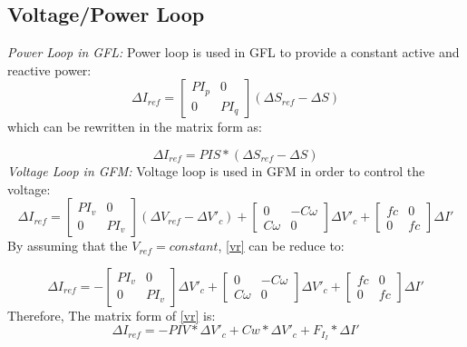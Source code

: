 \subsection{Voltage/Power Loop}
\textit{Power Loop in GFL:} Power loop is used in GFL to provide a constant active and reactive power:
\begin{equation}\label{pr}
\Delta I_{ref}=\begin{bmatrix}PI_p & 0 \\ 0 & PI_q \end{bmatrix}(\Delta S_{ref}-\Delta S)
\end{equation}
which  can be rewritten in the matrix form as:

\begin{equation}\label{pr2}
\Delta I_{ref}=PIS*(\Delta S_{ref}-\Delta S)
\end{equation}
\textit{Voltage Loop in GFM:} Voltage loop is used in GFM in order to control the voltage:
\begin{equation}\label{vr}
\Delta I_{ref}=\begin{bmatrix}PI_v & 0 \\ 0 & PI_v \end{bmatrix}(\Delta V_{ref} -\Delta V'_c)+\begin{bmatrix}0 & -C\omega \\ C\omega & 0 \end{bmatrix}\Delta V'_c+\begin{bmatrix}fc & 0 \\ 0 & fc \end{bmatrix}\Delta I'
\end{equation}
By assuming that the $V_{ref}=constant$, \ref{vr} can be reduce to:

\begin{equation}\label{vr2}
\Delta I_{ref}=-\begin{bmatrix}PI_v & 0 \\ 0 & PI_v \end{bmatrix}\Delta V'_c+\begin{bmatrix}0 & -C\omega \\ C\omega & 0 \end{bmatrix}\Delta V'_c+\begin{bmatrix}fc & 0 \\ 0 & fc \end{bmatrix}\Delta I'
\end{equation}
Therefore, The matrix form of \ref{vr} is:
\begin{equation}\label{vr3}
\Delta I_{ref}=-PIV*\Delta V'_c+Cw*\Delta V'_c+F_I_I*\Delta I'
\end{equation}

